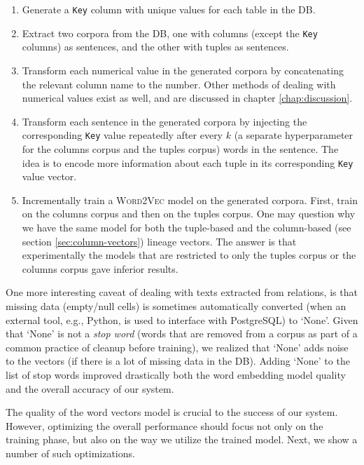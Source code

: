\begin{enumerate}
    \item Generate a \texttt{Key} column with unique values for each table in the DB.
    \item Extract two corpora from the DB, one with columns (except the \texttt{Key} columns) as sentences, and the other with tuples as sentences.
    \item Transform each numerical value in the generated corpora by concatenating the relevant column name to the number. Other methods of dealing with numerical values exist as well, and are discussed in chapter \ref{chap:discussion}.
    \item Transform each sentence in the generated corpora by injecting the corresponding \texttt{Key} value repeatedly after every $k$ (a separate hyperparameter for the columns corpus and the tuples corpus) words in the sentence. The idea is to encode more information about each tuple in its corresponding \texttt{Key} value vector.
    \item Incrementally train a \textsc{Word2Vec} model on the generated corpora. First, train on the columns corpus and then on the tuples corpus. One may question why we have the same model for both the tuple-based and the column-based (see section \ref{sec:column-vectors}) lineage vectors. The answer is that experimentally the models that are restricted to only the tuples corpus or the columns corpus gave inferior results.
\end{enumerate}
One more interesting caveat of dealing with texts extracted from relations, is that missing data (empty/null cells) is sometimes automatically converted (when an external tool, e.g., Python, is used to interface with PostgreSQL) to `None'. Given that `None' is not a \textit{stop word} (words that are removed from a corpus as part of a common practice of cleanup before training), we realized that `None' adds noise to the vectors (if there is a lot of missing data in the DB). Adding `None' to the list of stop words improved drastically both the word embedding model quality and the overall accuracy of our system. \\

\par The quality of the word vectors model is crucial to the success of our system. However, optimizing the overall performance should focus not only on the training phase, but also on the way we utilize the trained model. Next, we show a number of such optimizations.\\
